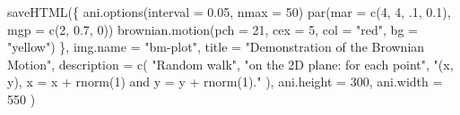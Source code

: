 \documentclass[
  b5paper,
  UTF8,twoside]{book}
\newenvironment{Shaded}{\begin{snugshade}}{\end{snugshade}}
\newcommand{\AttributeTok}[1]{\textcolor[rgb]{0.77,0.63,0.00}{#1}}
\newcommand{\DecValTok}[1]{\textcolor[rgb]{0.00,0.00,0.81}{#1}}
\newcommand{\FloatTok}[1]{\textcolor[rgb]{0.00,0.00,0.81}{#1}}
\newcommand{\FunctionTok}[1]{\textcolor[rgb]{0.00,0.00,0.00}{#1}}
\newcommand{\NormalTok}[1]{#1}
\newcommand{\StringTok}[1]{\textcolor[rgb]{0.31,0.60,0.02}{#1}}
\begin{document}
\begin{Shaded}
\begin{Highlighting}[]
\FunctionTok{saveHTML}\NormalTok{(\{}
  \FunctionTok{ani.options}\NormalTok{(}\AttributeTok{interval =} \FloatTok{0.05}\NormalTok{, }\AttributeTok{nmax =} \DecValTok{50}\NormalTok{)}
  \FunctionTok{par}\NormalTok{(}\AttributeTok{mar =} \FunctionTok{c}\NormalTok{(}\DecValTok{4}\NormalTok{, }\DecValTok{4}\NormalTok{, .}\DecValTok{1}\NormalTok{, }\FloatTok{0.1}\NormalTok{), }\AttributeTok{mgp =} \FunctionTok{c}\NormalTok{(}\DecValTok{2}\NormalTok{, }\FloatTok{0.7}\NormalTok{, }\DecValTok{0}\NormalTok{))}
  \FunctionTok{brownian.motion}\NormalTok{(}\AttributeTok{pch =} \DecValTok{21}\NormalTok{, }\AttributeTok{cex =} \DecValTok{5}\NormalTok{, }\AttributeTok{col =} \StringTok{"red"}\NormalTok{, }\AttributeTok{bg =} \StringTok{"yellow"}\NormalTok{)}
\NormalTok{\},}
\AttributeTok{img.name =} \StringTok{"bm{-}plot"}\NormalTok{,}
\AttributeTok{title =} \StringTok{"Demonstration of the Brownian Motion"}\NormalTok{,}
\AttributeTok{description =} \FunctionTok{c}\NormalTok{(}
  \StringTok{"Random walk"}\NormalTok{, }\StringTok{"on the 2D plane: for each point"}\NormalTok{,}
  \StringTok{"(x, y), x = x + rnorm(1) and y = y + rnorm(1)."}
\NormalTok{), }\AttributeTok{ani.height =} \DecValTok{300}\NormalTok{, }\AttributeTok{ani.width =} \DecValTok{550}
\NormalTok{)}
\end{Highlighting}
\end{Shaded}
\end{document}
